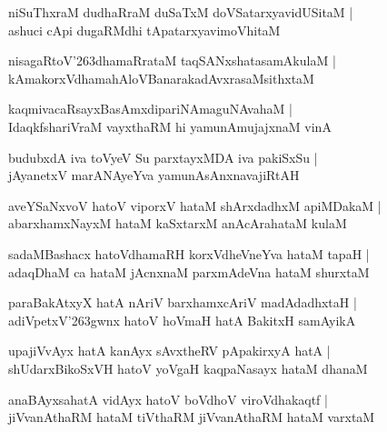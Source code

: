 \documentclass[twoside,12pt,openright]{book}
\def\S{\char'263}
\newcounter{shloka}[chapter]
\begin{document}
\begin{shloka}
niSuThxraM dudhaRraM duSaTxM doVSatarxyavidUSitaM |\\
ashuci cApi dugaRMdhi tApatarxyavimoVhitaM  
\end{shloka}

\begin{shloka}
nisagaRtoV\S dhamaRrataM taqSANxshatasamAkulaM |\\
kAmakorxVdhamahAloVBanarakadAvxrasaMsithxtaM 
\end{shloka}

\begin{shloka}
kaqmivacaRsayxBasAmxdipariNAmaguNAvahaM |\\
IdaqkfshariVraM vayxthaRM hi yamunAmujajxnaM vinA 
\end{shloka}

\begin{shloka}
budubxdA iva toVyeV Su parxtayxMDA iva pakiSxSu |\\
jAyanetxV marANAyeYva yamunAsAnxnavajiRtAH 
\end{shloka}

\begin{shloka}
aveYSaNxvoV hatoV viporxV hataM shArxdadhxM apiMDakaM |\\
abarxhamxNayxM hataM kaSxtarxM anAcArahataM kulaM 
\end{shloka}

\begin{shloka}
sadaMBashacx hatoVdhamaRH korxVdheVneYva hataM tapaH |\\
adaqDhaM ca hataM jAcnxnaM parxmAdeVna hataM shurxtaM 
\end{shloka}

\begin{shloka}
paraBakAtxyX hatA nAriV barxhamxcAriV madAdadhxtaH |\\
adiVpetxV\S gwnx hatoV hoVmaH hatA BakitxH samAyikA
\end{shloka}

\begin{shloka}
upajiVvAyx hatA kanAyx sAvxtheRV pApakirxyA hatA |\\
shUdarxBikoSxVH hatoV yoVgaH kaqpaNasayx hataM dhanaM 
\end{shloka}

\begin{shloka}
anaBAyxsahatA vidAyx hatoV boVdhoV viroVdhakaqtf |\\
jiVvanAthaRM hataM tiVthaRM jiVvanAthaRM hataM varxtaM 
\end{shloka}
\end{document}
